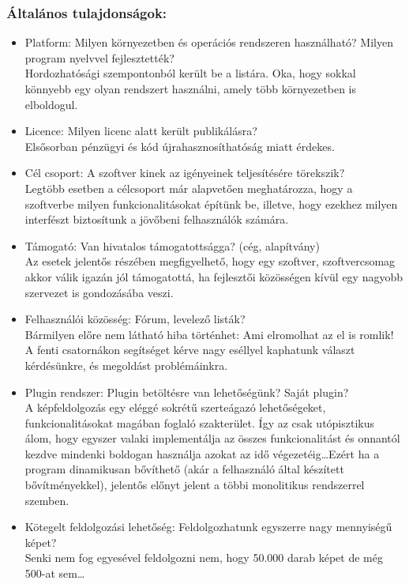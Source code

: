 \documentclass[a4paper,12pt,oneside]{report}
\begin{document}
\subsubsection{Általános tulajdonságok:}
\begin{itemize}
	\itemsep0em
	\item Platform: Milyen környezetben és operációs rendszeren használható? Milyen program nyelvvel fejlesztették? \\Hordozhatósági szempontonból került be a listára. Oka, hogy sokkal könnyebb egy olyan rendszert használni, amely több környezetben is elboldogul.
	\item Licence: Milyen licenc alatt került publikálásra?\\Elsősorban pénzügyi és kód újrahasznosíthatóság miatt érdekes.
	\item Cél csoport: A szoftver kinek az igényeinek teljesítésére törekszik?\\Legtöbb esetben a célcsoport már alapvetően meghatározza, hogy a szoftverbe milyen funkcionalitásokat építünk be, illetve, hogy ezekhez milyen interfészt biztosítunk a jövőbeni felhasználók számára.
	\item Támogató: Van hivatalos támogatottságga? (cég, alapítvány)\\Az esetek jelentős részében megfigyelhető, hogy egy szoftver, szoftvercsomag akkor válik igazán jól támogatottá, ha fejlesztői közösségen kívül egy nagyobb szervezet is gondozásába veszi.
	\item Felhasználói közösség: Fórum, levelező listák?\\Bármilyen előre nem látható hiba történhet: Ami elromolhat az el is romlik! A fenti csatornákon segítséget kérve nagy eséllyel kaphatunk választ kérdésünkre, és megoldást problémáinkra.
	\item Plugin rendszer: Plugin betöltésre van lehetőségünk? Saját plugin?\\A képfeldolgozás egy eléggé sokrétű szerteágazó lehetőségeket, funkcionalitásokat magában foglaló szakterület. Így az csak utópisztikus álom, hogy egyszer valaki implementálja az összes funkcionalitást és onnantól kezdve mindenki boldogan használja azokat az idő végezetéig\dots Ezért ha a program dinamikusan bővíthető (akár a felhasználó által készített bővítményekkel), jelentős előnyt jelent a többi monolitikus rendszerrel szemben.
	\item Kötegelt feldolgozási lehetőség: Feldolgozhatunk egyszerre nagy mennyiségű képet?\\Senki nem fog egyesével feldolgozni nem, hogy 50.000 darab képet de még 500-at sem\dots

\end{itemize}
\end{document}
